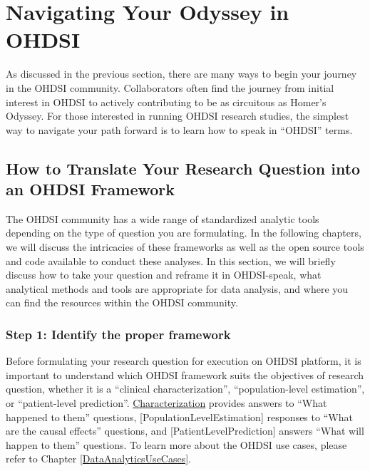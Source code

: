 \documentclass[11pt]{book}
\theoremstyle{definition}
\theoremstyle{definition}
\theoremstyle{definition}
\theoremstyle{remark}
\begin{document}
\hypertarget{navigating-your-odyssey-in-ohdsi}{%
\section{Navigating Your Odyssey in OHDSI}\label{navigating-your-odyssey-in-ohdsi}}

As discussed in the previous section, there are many ways to begin your journey in the OHDSI community. Collaborators often find the journey from initial interest in OHDSI to actively contributing to be as circuitous as Homer's Odyssey. For those interested in running OHDSI research studies, the simplest way to navigate your path forward is to learn how to speak in ``OHDSI'' terms.

\hypertarget{how-to-translate-your-research-question-into-an-ohdsi-framework}{%
\subsection{How to Translate Your Research Question into an OHDSI Framework}\label{how-to-translate-your-research-question-into-an-ohdsi-framework}}

The OHDSI community has a wide range of standardized analytic tools depending on the type of question you are formulating. In the following chapters, we will discuss the intricacies of these frameworks as well as the open source tools and code available to conduct these analyses. In this section, we will briefly discuss how to take your question and reframe it in OHDSI-speak, what analytical methods and tools are appropriate for data analysis, and where you can find the resources within the OHDSI community.

\hypertarget{step-1-identify-the-proper-framework}{%
\subsubsection{Step 1: Identify the proper framework}\label{step-1-identify-the-proper-framework}}

Before formulating your research question for execution on OHDSI platform, it is important to understand which OHDSI framework suits the objectives of research question, whether it is a ``clinical characterization'', ``population-level estimation'', or ``patient-level prediction''. \protect\hyperlink{Characterization}{Characterization} provides answers to ``What happened to them'' questions, {[}PopulationLevelEstimation{]} responses to ``What are the causal effects'' questions, and {[}PatientLevelPrediction{]} answers ``What will happen to them'' questions. To learn more about the OHDSI use cases, please refer to Chapter \ref{DataAnalyticsUseCases}.
\end{document}
